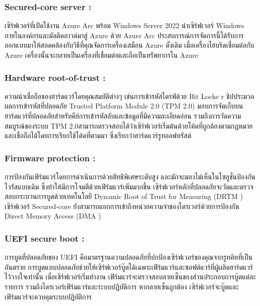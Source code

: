 \hspace{1cm}\subsubsection{Secured-core server : } เซิร์ฟเวอร์ที่เปิดใช้งาน Azure Arc พร้อม Windows Server 2022 นำเซิร์ฟเวอร์ Windows ภายในองค์กรและมัลติคลาวด์มาสู่ Azure ด้วย Azure Arc ประสบการณ์การจัดการนี้ได้รับการออกแบบมาให้สอดคล้องกับวิธีที่คุณจัดการเครื่องเสมือน Azure ดั้งเดิม เมื่อเครื่องไฮบริดเชื่อมต่อกับ Azure เครื่องนั้นจะกลายเป็นเครื่องที่เชื่อมต่อและถือเป็นทรัพยากรใน Azure 

\hspace{1cm}\subsubsection{Hardware root-of-trust : } ความน่าเชื่อถือของฮาร์ดแวร์โดยคุณสมบัติต่างๆ เช่นการเข้ารหัสไดรฟ์ด้วย Bit Locke r ชิปประมวลผลการเข้ารหัสที่ปลอดภัย Trusted Platform Module 2.0 (TPM 2.0) มอบการจัดเก็บบนฮาร์ดแวร์ที่ปลอดภัยสำหรับคีย์การเข้ารหัสลับและข้อมูลที่มีความละเอียดอ่อน รวมถึงการวัดความสมบูรณ์ของระบบ TPM 2.0สามารถตรวจสอบได้ว่าเซิร์ฟเวอร์เริ่มต้นด้วยโค้ดที่ถูกต้องตามกฎหมาย และเชื่อถือได้โดยการเรียกใช้โค้ดที่ตามมา ซึ่งเรียกว่าฮาร์ดแวร์รูทออฟทรัสต์ 

\hspace{1cm}\subsubsection{Firmware protection : } การป้องกันเฟิร์มแวร์โดยการดำเนินการด้วยสิทธิพิเศษระดับสูง และมักจะมองไม่เห็นในโซลูชั่นป้องกันไวรัสแบบเดิม ซึ่งทำให้มีการโจมตีด้วยเฟิร์มแวร์เพิ่มมากขึ้น เซิร์ฟเวอร์หลักที่ปลอดภัยจะวัดและตรวจสอบกระบวนการบูตด้วยเทคโนโลยี Dynamic Root of Trust for Measuring (DRTM ) เซิร์ฟเวอร์ Secured-core ยังสามารถแยกการเข้าถึงหน่วยความจำของไดรเวอร์ด้วยการป้องกัน Direct Memory Access (DMA ) 


\hspace{1cm}\subsubsection{UEFI secure boot : } การบูตที่ปลอดภัยของ UEFI คือมาตรฐานความปลอดภัยที่ปกป้องเซิร์ฟเวอร์ของคุณจากรูทคิทที่เป็นอันตราย การบูตแบบปลอดภัยช่วยให้เซิร์ฟเวอร์บู๊ตได้เฉพาะเฟิร์มแวร์และซอฟต์แวร์ที่ผู้ผลิตฮาร์ดแวร์ไว้วางใจเท่านั้น เมื่อเซิร์ฟเวอร์เริ่มทำงาน เฟิร์มแวร์จะตรวจสอบลายเซ็นของส่วนประกอบการบู๊ตแต่ละรายการ รวมถึงไดรเวอร์เฟิร์มแวร์และระบบปฏิบัติการ หากลายเซ็นถูกต้อง เซิร์ฟเวอร์จะบู๊ตและเฟิร์มแวร์จะควบคุมระบบปฏิบัติการ 

